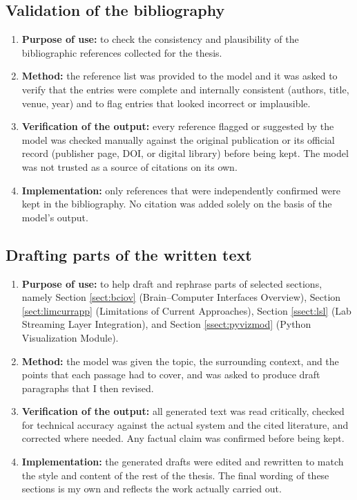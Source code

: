 \subsection*{Validation of the bibliography}
\begin{enumerate}
    \item \textbf{Purpose of use:} to check the consistency and plausibility of the bibliographic references collected for the thesis.
    \item \textbf{Method:} the reference list was provided to the model and it was asked to verify that the entries were complete and internally consistent (authors, title, venue, year) and to flag entries that looked incorrect or implausible.
    \item \textbf{Verification of the output:} every reference flagged or suggested by the model was checked manually against the original publication or its official record (publisher page, DOI, or digital library) before being kept. The model was not trusted as a source of citations on its own.
    \item \textbf{Implementation:} only references that were independently confirmed were kept in the bibliography. No citation was added solely on the basis of the model's output.
\end{enumerate}

\subsection*{Drafting parts of the written text}
\begin{enumerate}
    \item \textbf{Purpose of use:} to help draft and rephrase parts of selected sections, namely Section \ref{sect:bciov} (Brain--Computer Interfaces Overview), Section \ref{sect:limcurrapp} (Limitations of Current Approaches), Section \ref{ssect:lsl} (Lab Streaming Layer Integration), and Section \ref{ssect:pyvizmod} (Python Visualization Module).
    \item \textbf{Method:} the model was given the topic, the surrounding context, and the points that each passage had to cover, and was asked to produce draft paragraphs that I then revised.
    \item \textbf{Verification of the output:} all generated text was read critically, checked for technical accuracy against the actual system and the cited literature, and corrected where needed. Any factual claim was confirmed before being kept.
    \item \textbf{Implementation:} the generated drafts were edited and rewritten to match the style and content of the rest of the thesis. The final wording of these sections is my own and reflects the work actually carried out.
\end{enumerate}

